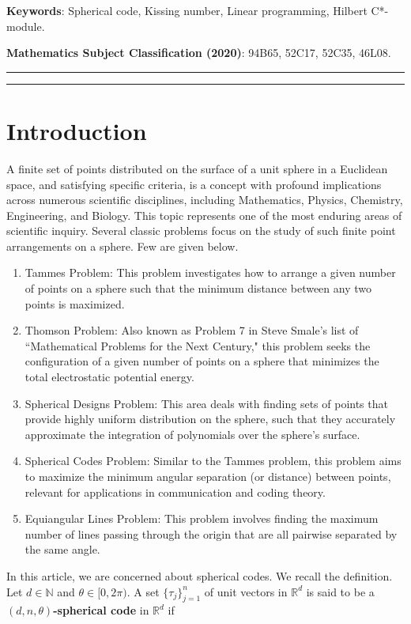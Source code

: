 \documentclass{amsart}
\begin{document}
\textbf{Keywords}:  Spherical code, Kissing number, Linear programming, Hilbert C*-module.

\textbf{Mathematics Subject Classification (2020)}: 94B65, 52C17, 52C35, 46L08.

\hrule


\hrule
\section{Introduction}
A finite set of points distributed on the surface of a unit sphere in a Euclidean space, and satisfying specific criteria, is a concept with profound implications across numerous scientific disciplines, including Mathematics, Physics, Chemistry, Engineering, and Biology. This topic represents one of the most enduring areas of scientific inquiry.
Several classic problems focus on the study of such finite point arrangements on a sphere. Few are given below. 
\begin{enumerate}[\upshape (i)]
	\item Tammes Problem: This problem investigates how to arrange a given number of points on a sphere such that the minimum distance between any two points is maximized.
\item Thomson Problem: Also known as Problem 7 in Steve Smale's list of ``Mathematical Problems for the Next Century," this problem seeks the configuration of a given number of points on a sphere that minimizes the total electrostatic potential energy.
\item Spherical Designs Problem: This area deals with finding sets of points that provide highly uniform distribution on the sphere, such that they accurately approximate the integration of polynomials over the sphere's surface.
\item Spherical Codes Problem: Similar to the Tammes problem, this problem aims to maximize the minimum angular separation (or distance) between points, relevant for applications in communication and coding theory.
\item Equiangular Lines Problem: This problem involves finding the maximum number of lines passing through the origin that are all pairwise separated by the same angle.
\end{enumerate}
In this article, we are concerned about spherical codes. We recall the definition.
Let $d\in \mathbb{N}$ and $\theta \in [0, 2\pi)$. A set $\{\tau_j\}_{j=1}^n$  of unit vectors  in $\mathbb{R}^d$	is said to be a \textbf{$(d,n,\theta )$-spherical code} \cite{ZONG} in $\mathbb{R}^d$ if 
\end{document}
